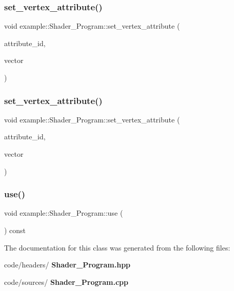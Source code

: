 \mbox{\label{classexample_1_1_shader___program_ae02dbec6468a93f30db194d40a1fd518}} 
\subsubsection{set\_vertex\_attribute()\hspace{0.1cm}{\footnotesize\ttfamily [3/4]}}
{\footnotesize\ttfamily void example\+::\+Shader\+\_\+\+Program\+::set\+\_\+vertex\+\_\+attribute (\begin{DoxyParamCaption}\item[{G\+Lint}]{attribute\+\_\+id,  }\item[{const Vector3f \&}]{vector }\end{DoxyParamCaption})\hspace{0.3cm}{\ttfamily [inline]}}

\mbox{\label{classexample_1_1_shader___program_a9629fefd3e83e7c0f9ff52589e341393}} 
\subsubsection{set\_vertex\_attribute()\hspace{0.1cm}{\footnotesize\ttfamily [4/4]}}
{\footnotesize\ttfamily void example\+::\+Shader\+\_\+\+Program\+::set\+\_\+vertex\+\_\+attribute (\begin{DoxyParamCaption}\item[{G\+Lint}]{attribute\+\_\+id,  }\item[{const Vector4f \&}]{vector }\end{DoxyParamCaption})\hspace{0.3cm}{\ttfamily [inline]}}

\mbox{\label{classexample_1_1_shader___program_a70c29ba798a57a71ca2b74463f5ffe19}} 
\subsubsection{use()}
{\footnotesize\ttfamily void example\+::\+Shader\+\_\+\+Program\+::use (\begin{DoxyParamCaption}{ }\end{DoxyParamCaption}) const\hspace{0.3cm}{\ttfamily [inline]}}



The documentation for this class was generated from the following files\+:\begin{DoxyCompactItemize}
\item 
code/headers/\textbf{ Shader\+\_\+\+Program.\+hpp}\item 
code/sources/\textbf{ Shader\+\_\+\+Program.\+cpp}\end{DoxyCompactItemize}
